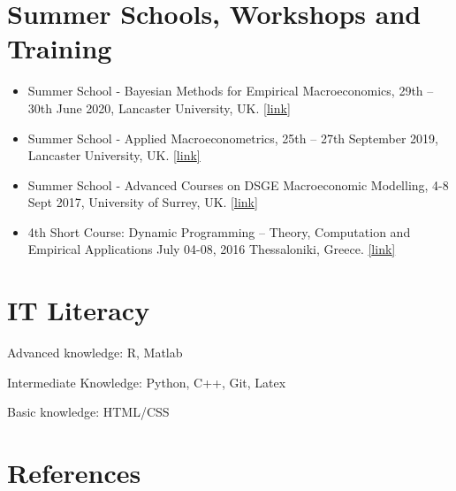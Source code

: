 \documentclass[10pt,]{article}
\begin{document}
              \hypertarget{summer-schools-workshops-and-training}{%
              \section{Summer Schools, Workshops and
              Training}\label{summer-schools-workshops-and-training}}

              \begin{itemize}
              \item
                Summer School - Bayesian Methods for Empirical
                Macroeconomics, 29th -- 30th June 2020, Lancaster
                University, UK.
                \href{https://sites.google.com/view/lancseconsummer/home}{{[}link{]}}
              \item
                Summer School - Applied Macroeconometrics, 25th -- 27th
                September 2019, Lancaster University, UK.
                \href{http://wp.lancs.ac.uk/lancaster-phd-summer-school-2019/}{{[}link{]}}
              \item
                Summer School - Advanced Courses on DSGE Macroeconomic
                Modelling, 4-8 Sept 2017, University of Surrey, UK.
                \href{https://www.surrey.ac.uk/events/20180903-foundations-and-advanced-courses-dsge-macroeconomic-modelling-and-conference-summer}{{[}link{]}}
              \item
                4th Short Course: Dynamic Programming -- Theory,
                Computation and Empirical Applications July 04-08, 2016
                Thessaloniki, Greece.
                \href{http://sce2016.uom.gr/}{{[}link{]}}
              \end{itemize}

              \hypertarget{it-literacy}{%
              \section{IT Literacy}\label{it-literacy}}

              Advanced knowledge: R, Matlab

              Intermediate Knowledge: Python, C++, Git, Latex

              Basic knowledge: HTML/CSS

              \hypertarget{references}{%
              \section{References}\label{references}}
\end{document}
